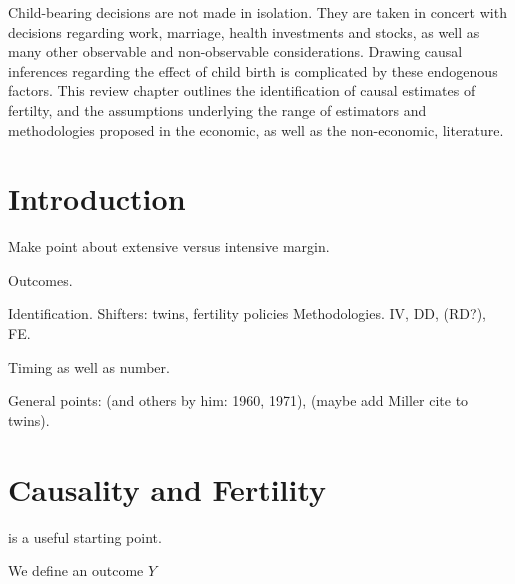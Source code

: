 \begin{chapabstract}
Child-bearing decisions are not made in isolation.  They are taken in concert 
with decisions regarding work, marriage, health investments and stocks, as well 
as many other observable and non-observable considerations.  Drawing causal 
inferences regarding the effect of child birth is complicated by these 
endogenous factors.  This review chapter outlines the identification of causal
estimates of fertilty, and the assumptions underlying the range of estimators
and methodologies proposed in the economic, as well as the non-economic, 
literature.
\end{chapabstract}

\newpage
\section{Introduction}
Make point about extensive versus intensive margin.

Outcomes.

Identification.  Shifters: twins, fertility policies
Methodologies. IV, DD, (RD?), FE.

Timing as well as number.

General points: \citet{Enke1966} (and others by him: 1960, 1971), 
\citet{KearneyLevine2012, Schultz2008, GMiller2009, RosenzweigWolpin1986}
(maybe add Miller cite to twins).


\newpage
\section{Causality and Fertility}
\label{Fscn:causality}
\citet{Moffitt2005} is a useful starting point.

We define an outcome $Y$



\newpage
